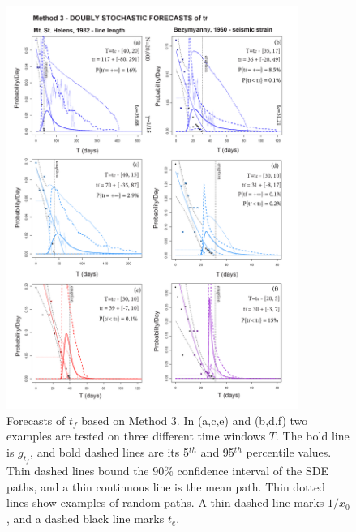 \documentclass{article}
\begin{document}
\begin{figure}[H]\vskip-0.5cm
\centering
\includegraphics[width=0.85\textwidth]{Fig10_11new.png}
\caption{Forecasts of $t_f$ based on Method 3. In (a,c,e) and (b,d,f) two examples are tested on three different time windows $T$. The bold line is $g_{t_f}$, and bold dashed lines are its 5$^{th}$ and 95$^{th}$ percentile values. Thin dashed lines bound the $90\%$ confidence interval of the SDE paths, and a thin continuous line is the mean path. Thin dotted lines show examples of random paths. A thin dashed line marks $1/x_0$, and a dashed black line marks $t_e$.}
\label{Fig9_11}
\end{figure}
\end{document}
